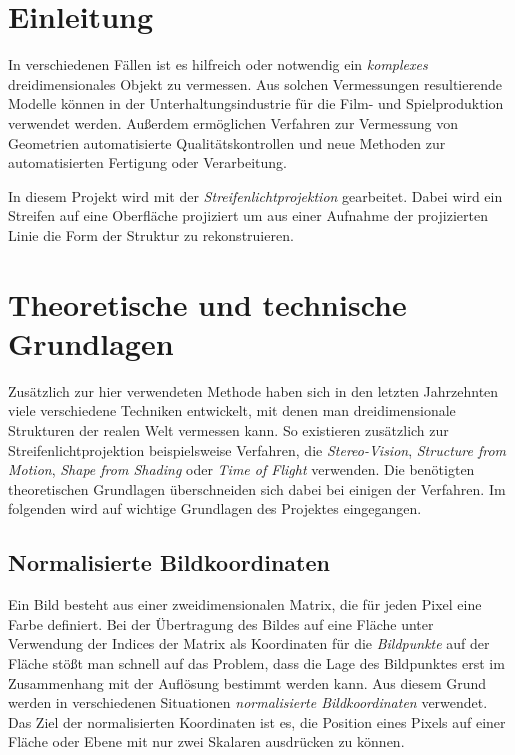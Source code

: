 \documentclass[ngerman,a4paper,parskip=half]{scrartcl}
\begin{document}


\tableofcontents
\newpage


\section{Einleitung}

In verschiedenen Fällen ist es hilfreich oder notwendig ein \emph{komplexes} dreidimensionales Objekt zu vermessen. Aus solchen Vermessungen resultierende Modelle können in der Unterhaltungsindustrie für die Film- und Spielproduktion verwendet werden. Außerdem ermöglichen Verfahren zur Vermessung von Geometrien automatisierte Qualitätskontrollen und neue Methoden zur automatisierten Fertigung oder Verarbeitung.

In diesem Projekt wird mit der \emph{Streifenlichtprojektion} gearbeitet. Dabei wird ein Streifen auf eine Oberfläche projiziert um aus einer Aufnahme der projizierten Linie die Form der Struktur zu rekonstruieren.


\section{Theoretische und technische Grundlagen}

Zusätzlich zur hier verwendeten Methode haben sich in den letzten Jahrzehnten viele verschiedene Techniken entwickelt, mit denen man dreidimensionale Strukturen der realen Welt vermessen kann. So existieren zusätzlich zur Streifenlichtprojektion beispielsweise Verfahren, die \emph{Stereo-Vision}, \emph{Structure from Motion}, \emph{Shape from Shading} oder \emph{Time of Flight} verwenden. Die benötigten theoretischen Grundlagen überschneiden sich dabei bei einigen der Verfahren. Im folgenden wird auf wichtige Grundlagen des Projektes eingegangen.

\subsection{Normalisierte Bildkoordinaten}
\label{sec:imagecoordinates}

Ein Bild besteht aus einer zweidimensionalen Matrix, die für jeden Pixel eine Farbe definiert. Bei der Übertragung des Bildes auf eine Fläche unter Verwendung der Indices der Matrix als Koordinaten für die \emph{Bildpunkte} auf der Fläche stößt man schnell auf das Problem, dass die Lage des Bildpunktes erst im Zusammenhang mit der Auflösung bestimmt werden kann. Aus diesem Grund werden in verschiedenen Situationen \emph{normalisierte Bildkoordinaten} verwendet. Das Ziel der normalisierten Koordinaten ist es, die Position eines Pixels auf einer Fläche oder Ebene mit nur zwei Skalaren ausdrücken zu können.
\end{document}
